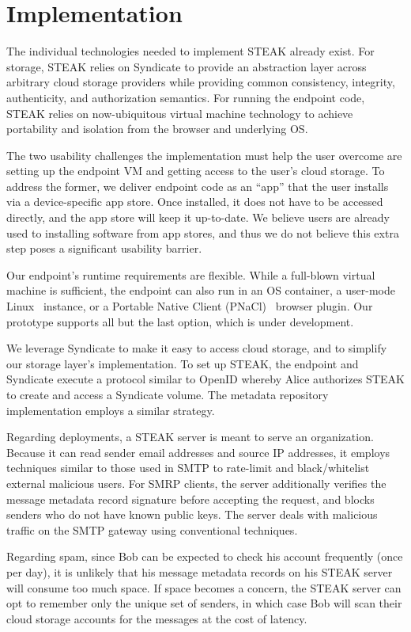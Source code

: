 \section{Implementation}

The individual technologies needed to implement STEAK already exist.  For storage, STEAK relies on Syndicate to provide an abstraction layer across arbitrary cloud storage providers while providing common consistency, integrity, authenticity, and authorization semantics.  For running the endpoint code, STEAK relies on now-ubiquitous virtual machine technology to achieve portability and isolation from the browser and underlying OS.

The two usability challenges the implementation must help the user overcome are setting up the endpoint VM and getting access to the user’s cloud storage.  To address the former, we deliver endpoint code as an “app” that the user installs via a device-specific app store.  Once installed, it does not have to be accessed directly, and the app store will keep it up-to-date.  We believe users are already used to installing software from app stores, and thus we do not believe this extra step poses a significant usability barrier.

Our endpoint’s runtime requirements are flexible.  While a full-blown virtual machine is sufficient, the endpoint can also run in an OS container, a user-mode Linux~\cite{usermode-linux} instance, or a Portable Native Client (PNaCl)~\cite{pnacl} browser plugin.  Our prototype supports all but the last option, which is under development.

We leverage Syndicate to make it easy to access cloud storage, and to simplify our storage layer’s implementation.  To set up STEAK, the endpoint and Syndicate execute a protocol similar to OpenID whereby Alice authorizes STEAK to create and access a Syndicate volume.  The metadata repository implementation employs a similar strategy.

Regarding deployments, a STEAK server is meant to serve an organization.  Because it can read sender email addresses and source IP addresses, it employs techniques similar to those used in SMTP to rate-limit and black/whitelist external malicious users.  For SMRP clients, the server additionally verifies the message metadata record signature before accepting the request, and blocks senders who do not have known public keys.  The server deals with malicious traffic on the SMTP gateway using conventional techniques.

Regarding spam, since Bob can be expected to check his account frequently (once per day), it is unlikely that his message metadata records on his STEAK server will consume too much space.  If space becomes a concern, the STEAK server can opt to remember only the unique set of senders, in which case Bob will scan their cloud storage accounts for the messages at the cost of latency.

